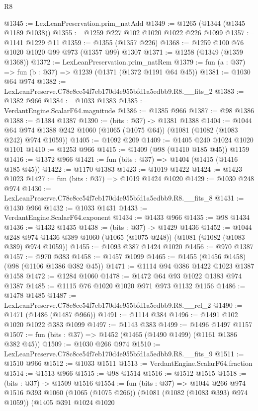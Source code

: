 \begin{lexlean}{R8}
\begin{coremodule}
@1345 := LexLeanPreservation.prim_natAdd
@1349 := @1265 (@1344 (@1345 @1189 @1038))
@1355 := @1259 @227 @102 @1020 @1022 @226 @1099
@1357 := @1141 @1229 @11
@1359 := @1355 (@1357 @226)
@1368 := @1259 @100 @76 @1020 @1020 @99 @973 (@1357 @99) @1307
@1371 := @1258 (@1349 (@1359 @1368))
@1372 := LexLeanPreservation.prim_natRem
@1379 := fun (a : @37) => fun (b : @37) => @1239 (@1371 (@1372 @1191 @64 @45))
@1381 := @1030 @64 @974
@1382 := LexLeanPreserve.C78c8ce54f7eb170d4e955bfd1a5edbb9.R8.__fits_2
@1383 := @1382 @966
@1384 := @1033 @1383
@1385 := VerdantEngine.ScalarF64.magnitude
@1386 := @1385 @966
@1387 := @98 @1386
@1388 := @1384 @1387
@1390 := (bits : @37) -> @1381 @1388
@1404 := @1044 @64 @974 @1388 @242 @1060 (@1065 (@1075 @64)) (@1081 (@1082 (@1083 @242) @974 @1059))
@1405 := @1092 @209
@1409 := @1405 @240 @1024 @1020 @1101
@1410 := @1253 @966
@1415 := @1409 (@98 (@1410 @185 @45)) @1159
@1416 := @1372 @966
@1421 := fun (bits : @37) => @1404 (@1415 (@1416 @185 @45))
@1422 := @1170 @1383
@1423 := @1019 @1422
@1424 := @1423 @1023
@1427 := fun (bits : @37) => @1019 @1424 @1020
@1429 := @1030 @248 @974
@1430 := LexLeanPreserve.C78c8ce54f7eb170d4e955bfd1a5edbb9.R8.__fits_8
@1431 := @1430 @966
@1432 := @1033 @1431
@1433 := VerdantEngine.ScalarF64.exponent
@1434 := @1433 @966
@1435 := @98 @1434
@1436 := @1432 @1435
@1438 := (bits : @37) -> @1429 @1436
@1452 := @1044
    @248
    @974
    @1436
    @389
    @1060
    (@1065 (@1075 @248))
    (@1081 (@1082 (@1083 @389) @974 @1059))
@1455 := @1093 @387 @1424 @1020
@1456 := @970 @1387
@1457 := @970 @383
@1458 := @1457 @1099
@1465 := @1455 (@1456 @1458) (@98 (@1106 @1386 @382 @45))
@1471 := @1114 @94 @386 @1422 @1023 @1387 @1458
@1472 := @1284 @1060
@1478 := @1472 @64 @93 @1022 @1383 @974 @1387
@1485 := @1115 @76 @1020 @1020 @971 @973 @1132 @1156
@1486 := @1478 @1485
@1487 := LexLeanPreserve.C78c8ce54f7eb170d4e955bfd1a5edbb9.R8.__rel_2
@1490 := @1471 (@1486 (@1487 @966))
@1491 := @1114 @384
@1496 := @1491 @102 @1020 @1022 @383 @1099
@1497 := @1143 @383
@1499 := @1496 @1497 @1157
@1507 := fun (bits : @37) => @1452 (@1465 (@1490 @1499) (@1161 @1386 @382 @45))
@1509 := @1030 @266 @974
@1510 := LexLeanPreserve.C78c8ce54f7eb170d4e955bfd1a5edbb9.R8.__fits_9
@1511 := @1510 @966
@1512 := @1033 @1511
@1513 := VerdantEngine.ScalarF64.fraction
@1514 := @1513 @966
@1515 := @98 @1514
@1516 := @1512 @1515
@1518 := (bits : @37) -> @1509 @1516
@1554 := fun (bits : @37) =>
  @1044
    @266
    @974
    @1516
    @393
    @1060
    (@1065 (@1075 @266))
    (@1081 (@1082 (@1083 @393) @974 @1059))
    (@1405
      @391
      @1024
      @1020

\end{coremodule}
\end{lexlean}
